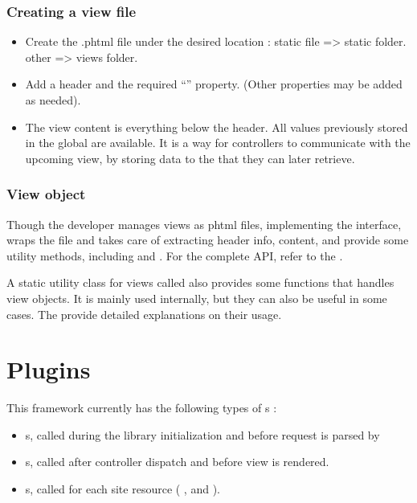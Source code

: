 \documentclass[pdftex,12pt,a4paper]{article}
\begin{document}
\subsubsection{Creating a view file} \label{sec:creating-the-view-file}

\begin{itemize}
	\item Create the .phtml file under the desired location : static file =>  static folder. other =>  views folder.
	\item Add a  header and the required ``'' property. (Other properties may be added as needed).
	\item The view content is everything below the header. All values previously stored in the global  are available. It is a way for controllers to communicate with the upcoming view, by storing data to the  that they can later retrieve.
\end{itemize}

\subsubsection{View object}

Though the developer manages views as phtml files,  implementing the  interface, wraps the file and takes care of extracting header info, content, and provide some utility methods, including  and . For the complete API, refer to the .

A static utility class for views called  also provides some functions that handles view objects.
It is mainly used internally, but they can also be useful in some cases. The  provide detailed explanations on their usage.

\section{Plugins} \label{sec:plugins}

This framework currently has the following types of s :
\begin{itemize}
	\item {}s, called during the library initialization and before request is parsed by 
	\item {}s, called after controller dispatch and before view is rendered.
	\item {}s, called for each site resource ( ,  and ).
\end{itemize}
\end{document}
